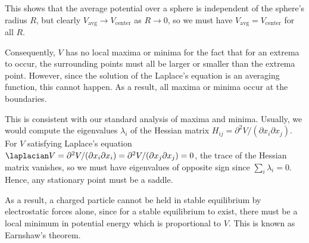 \documentclass[english,a4paper,12pt]{report}
\begin{document}
This shows that the average potential over a sphere is independent of the sphere's radius \(R\), but clearly \(V_{\text{avg} } \to V_{\text{center} }  \) as \(R \to 0\), so we must have \(V_{\text{avg} } = V_{\text{center} }  \) for all \(R\).   

Consequently, \(V\) has no local maxima or minima for the fact that for an extrema to occur, the surrounding points must all be larger or smaller than the extrema point. However, since the solution of the Laplace's equation is an averaging function, this cannot happen. As a result, all maxima or minima occur at the boundaries.

This is consistent with our standard analysis of maxima and minima. Usually, we would compute the eigenvalues \(\lambda_i\) of the Hessian matrix \(H_{ij} = \partial^2 V / (\partial x_i \partial x_j)\). For \(V\) satisfying Laplace's equation \(\laplacian  V = \partial^2 V / (\partial x_i \partial x_i) = \partial^2 V / (\partial x_j \partial x_j) = 0\), the trace of the Hessian matrix vanishes, so we must have eigenvalues of opposite sign since \(\sum_{i} \lambda_i = 0\). Hence, any stationary point must be a saddle.

As a result, a charged particle cannot be held in stable equilibrium by electrostatic forces alone, since for a stable equilibrium to exist, there must be a local minimum in potential energy which is proportional to \(V\). This is known as Earnshaw's theorem.
\end{document}
